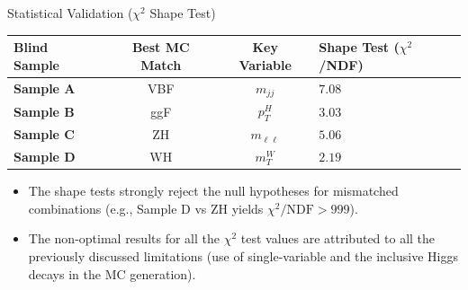 \begin{frame}{Statistical Validation ($\chi^2$ Shape Test)}    
    \vspace{0.2cm}
    \centering
    \renewcommand{\arraystretch}{1.3}
    \begin{tabular}{l c c l}
        \hline
        \textbf{Blind Sample} & \textbf{Best MC Match} & \textbf{Key Variable} & \textbf{Shape Test ($\chi^2$/NDF)} \\ \hline
        \textbf{Sample A} & VBF & $m_{jj}$ & $\mathbf{7.08}$ \\
        \textbf{Sample B} & ggF & $p_T^H$ & $\mathbf{3.03}$  \\
        \textbf{Sample C} & ZH & $m_{\ell\ell}$ & $\mathbf{5.06}$  \\ 
        \textbf{Sample D} & WH & $m_T^W$ & $\mathbf{2.19}$ \\ \hline
    \end{tabular}
    
    \vspace{0.2cm}
    \begin{itemize}
        \item The shape tests strongly reject the null hypotheses for mismatched combinations (e.g., Sample D vs ZH yields $\chi^2/\text{NDF} >999$).
        \item The non-optimal results for all the $\chi^2$ test values are attributed to all the previously discussed limitations (use of single-variable and the inclusive Higgs decays in the MC generation).
    \end{itemize}
\end{frame}

    
    
